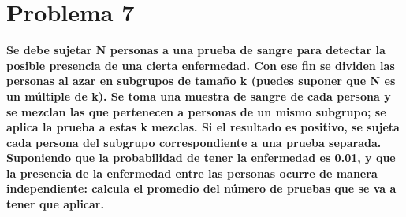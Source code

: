 \section*{Problema 7}
\textbf{Se debe sujetar N personas a una prueba de sangre para detectar la posible presencia de una cierta enfermedad. Con ese fin se dividen las personas al azar en subgrupos de tamaño k (puedes suponer que N es un múltiple de k). Se toma una muestra de sangre de cada persona y se mezclan las que pertenecen a personas de un mismo subgrupo; se aplica la prueba a estas k mezclas. Si el resultado es positivo, se sujeta cada persona del subgrupo correspondiente a una prueba separada. Suponiendo que la probabilidad de tener la enfermedad es 0.01, y que la presencia de la enfermedad entre las personas ocurre de manera independiente: calcula el promedio del número de pruebas que se va a tener que aplicar.}